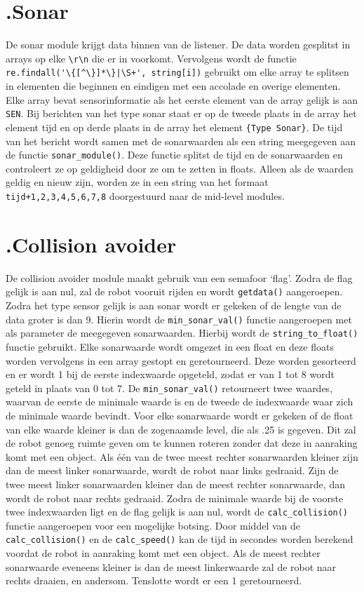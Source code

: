 \documentclass[a4paper,10pt]{article}
\begin{document}
\section*{\label{sonar}\thesection.\quad Sonar}
De sonar module krijgt data binnen van de listener. De data worden gesplitst in arrays op elke \verb!\r\n! die er in voorkomt. Vervolgens wordt de functie \verb!re.findall('\{[^\}]*\}|\S+', string[i])! gebruikt om elke array te splitsen in elementen die beginnen en eindigen met een accolade en overige elementen. Elke array bevat sensorinformatie als het eerste element van de array gelijk is aan \verb!SEN!. Bij berichten van het type sonar staat er op de tweede plaats in de array het element tijd en op derde plaats in de array het element \verb!{Type Sonar}!. De tijd van het bericht wordt samen met de sonarwaarden als een string meegegeven aan de functie \verb!sonar_module()!. Deze functie splitst de tijd en de sonarwaarden en controleert ze op geldigheid door ze om te zetten in floats. Alleen als de waarden geldig en nieuw zijn, worden ze in een string van het formaat \verb!tijd+1,2,3,4,5,6,7,8! doorgestuurd naar de mid-level modules.

\section*{\label{collisionavoider}\thesection.\quad Collision avoider}
De collision avoider module maakt gebruik van een semafoor `flag'. Zodra de flag gelijk is aan nul, zal de robot vooruit rijden en wordt \verb!getdata()! aangeroepen. Zodra het type sensor gelijk is aan sonar wordt er gekeken of de lengte van de data groter is dan 9. Hierin wordt de \verb!min_sonar_val()! functie aangeroepen met als parameter de meegegeven sonarwaarden. Hierbij wordt de \verb!string_to_float()! functie gebruikt. Elke sonarwaarde wordt omgezet in een float en deze floats worden vervolgens in een array gestopt en geretourneerd. Deze worden gesorteerd en er wordt 1 bij de eerste indexwaarde opgeteld, zodat er van 1 tot 8 wordt geteld in plaats van 0 tot 7. De \verb!min_sonar_val()! retourneert twee waardes, waarvan de eerste de minimale waarde is en de tweede de indexwaarde waar zich de minimale waarde bevindt.
Voor elke sonarwaarde wordt er gekeken of de float van elke waarde kleiner is dan de zogenaamde level, die als .25 is gegeven. Dit zal de robot genoeg ruimte geven om te kunnen roteren zonder dat deze in aanraking komt met een object. Als \'{e}\'{e}n van de twee meest rechter sonarwaarden kleiner zijn dan de meest linker sonarwaarde, wordt de robot naar links gedraaid. Zijn de twee meest linker sonarwaarden kleiner dan de meest rechter sonarwaarde, dan wordt de robot naar rechts gedraaid. Zodra de minimale waarde bij de voorste twee indexwaarden ligt en de flag gelijk is aan nul, wordt de \verb!calc_collision()! functie aangeroepen voor een mogelijke botsing. Door middel van de \verb!calc_collision()! en de \verb!calc_speed()! kan de tijd in secondes worden berekend voordat de robot in aanraking komt met een object. Als de meest rechter sonarwaarde eveneens kleiner is dan de meest linkerwaarde zal de robot naar rechts draaien, en andersom. Tenslotte wordt er een 1 geretourneerd.
\end{document}

